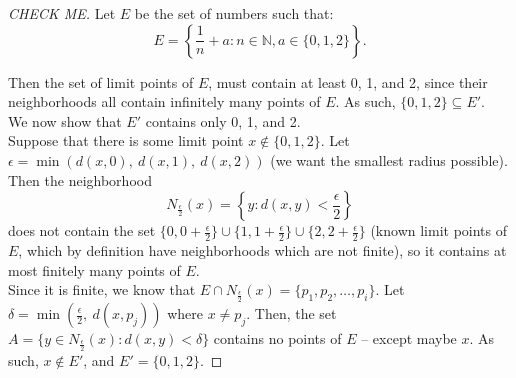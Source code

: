 \documentclass[10pt]{article}
\theoremstyle{definition}
\theoremstyle{plain}
\newcommand{\N}{\mathbb{N}}
\newcommand{\Z}{\mathbb{Z}}
\newcommand{\R}{\mathbb{R}}
\begin{document}
\begin{proof}[CHECK ME]
Let $E$ be the set of numbers such that:
$$E = \left\{\frac{1}{n} + a: n\in\N, a\in\{0,1,2\} \right\}.$$

Then the set of limit points of $E$, must contain at least 0, 1, and 2, since their neighborhoods all contain infinitely many points of $E$. As such, $\{0,1,2\}\subseteq E'$. \\

We now show that $E'$ contains only 0, 1, and 2. \\

Suppose that there is some limit point $x\not\in\{0,1,2\}$. Let $\epsilon = \min(d(x,0),\ d(x,1),\ d(x,2))$ (we want the smallest radius possible). Then the neighborhood $$N_\frac{\epsilon}{2} (x) = \left\{y: d(x,y) < \frac{\epsilon}{2}\right\}$$
does not contain the set $\{0, 0+\frac{\epsilon}{2}\}\cup\{1, 1+\frac{\epsilon}{2}\}\cup\{2, 2+\frac{\epsilon}{2}\}$ (known limit points of $E$, which by definition have neighborhoods which are not finite), so it contains at most finitely many points of $E$. \\

Since it is finite, we know that $E\cap N_\frac{\epsilon}{2} (x) = \{p_1, p_2, \dots, p_i\}$. Let $\delta = \min(\frac{\epsilon}{2},\ d(x,p_j))$ where $x\neq p_j$. Then, the set $A=\{y\in N_\frac{\epsilon}{2} (x): d(x,y) < \delta\}$ contains no points of $E$ -- except maybe $x$. As such, $x\not\in E'$, and $E' = \{0,1,2\}$.







\end{proof}
\end{document}
